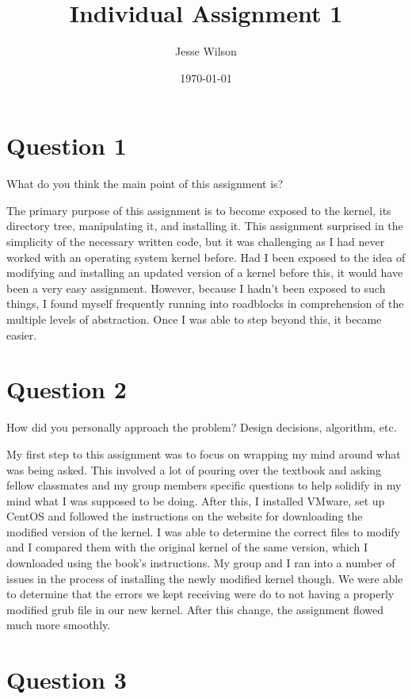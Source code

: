 \documentclass[a4paper]{article}
\title{Individual Assignment 1}
\author{Jesse Wilson}
\date{\today}
\begin{document}
\maketitle


\section{Question 1}

What do you think the main point of this assignment is?


The primary purpose of this assignment is to become exposed to the kernel, its directory tree, manipulating it, and installing it. This assignment surprised in the simplicity of the necessary written code, but it was challenging as I had never worked with an operating system kernel before. Had I been exposed to the idea of modifying and installing an updated version of a kernel before this, it would have been a very easy assignment. However, because I hadn't been exposed to such things, I found myself frequently running into roadblocks in comprehension of the multiple levels of abstraction. Once I was able to step beyond this, it became easier.

\section{Question 2}

How did you personally approach the problem? Design decisions, algorithm, etc.


My first step to this assignment was to focus on wrapping my mind around what was being asked. This involved a lot of pouring over the textbook and asking fellow classmates and my group members specific questions to help solidify in my mind what I was supposed to be doing. After this, I installed VMware, set up CentOS and followed the instructions on the website for downloading the modified version of the kernel. I was able to determine the correct files to modify and I compared them with the original kernel of the same version, which I downloaded using the book's instructions. My group and I ran into a number of issues in the process of installing the newly modified kernel though. We were able to determine that the errors we kept receiving were do to not having a properly modified grub file in our new kernel. After this change, the assignment flowed much more smoothly. 

\section{Question 3}
\end{document}
